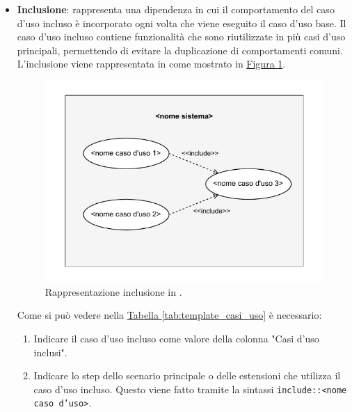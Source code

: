 \begin{itemize}
\begin{itemize}
        \item \textbf{Inclusione}: rappresenta una dipendenza in cui il comportamento del caso d'uso incluso è incorporato ogni volta che viene eseguito il caso d'uso base. Il caso d'uso incluso contiene funzionalità che sono riutilizzate in più casi d'uso principali, permettendo di evitare la duplicazione di comportamenti comuni.
        L'inclusione viene rappresentata in  come mostrato in \hyperref[fig:inclusione_uml]{Figura \ref{fig:inclusione_uml}}.
        \begin{figure}[H]
            \centering
            \includegraphics{Sezioni/ProcessiPrimari/Immagini/inclusione_uml.pdf}
            \caption{Rappresentazione inclusione in .}
            \label{fig:inclusione_uml}
        \end{figure}
        Come si può vedere nella \hyperref[tab:template_casi_uso]{Tabella \ref{tab:template_casi_uso}} è necessario:
        \begin{enumerate}
            \item Indicare il caso d'uso incluso come valore della colonna "Casi d'uso inclusi".
            \item Indicare lo step dello scenario principale o delle estensioni che utilizza il caso d'uso incluso.
            Questo viene fatto tramite la sintassi \texttt{include::<nome caso d'uso>}.
        \end{enumerate} 


\end{itemize}
\end{itemize}
